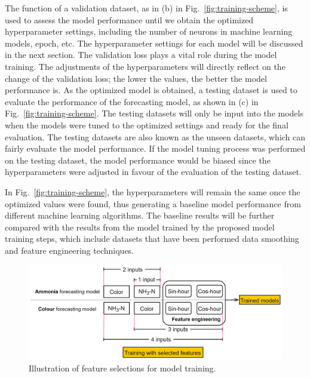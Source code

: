 The function of a validation dataset, as in (b) in Fig.~\ref{fig:training-scheme}, is used to assess the model performance until we obtain the optimized hyperparameter settings, including the number of neurons in machine learning models, epoch, etc. The hyperparameter settings for each model will be discussed in the next section. The validation loss plays a vital role during the model training. The adjustments of the hyperparameters will directly reflect on the change of the validation loss; the lower the values, the better the model performance is. As the optimized model is obtained, a testing dataset is used to evaluate the performance of the forecasting model, as shown in (c) in Fig.~\ref{fig:training-scheme}. The testing datasets will only be input into the models when the models were tuned to the optimized settings and ready for the final evaluation. The testing datasets are also known as the unseen datasets, which can fairly evaluate the model performance. If the model tuning process was performed on the testing dataset, the model performance would be biased since the hyperparameters were adjusted in favour of the evaluation of the testing dataset.

In Fig.~\ref{fig:training-scheme}, the hyperparameters will remain the same once the optimized values were found, thus generating a baseline model performance from different machine learning algorithms. The baseline results will be further compared with the results from the model trained by the proposed model training steps, which include datasets that have been performed data smoothing and feature engineering techniques.

\begin{figure}[!ht]
    \centering
    \includegraphics[width=1.0\columnwidth]{imgs/pre-processing/feature-selection.png}
    \caption{Illustration of feature selections for model training.}
    \label{fig:feature-selection}
 \end{figure}

